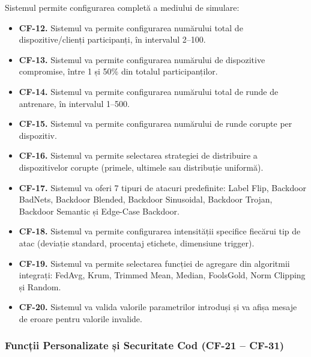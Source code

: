 \documentclass[../../main.tex]{subfiles}
\begin{document}
        Sistemul permite configurarea completă a mediului de simulare:
        \begin{itemize}
            \item \textbf{CF-12.} Sistemul va permite configurarea numărului total de dispozitive/clienți participanți, în intervalul 2--100.
            \item \textbf{CF-13.} Sistemul va permite configurarea numărului de dispozitive compromise, între 1 și 50\% din totalul participanților.
            \item \textbf{CF-14.} Sistemul va permite configurarea numărului total de runde de antrenare, în intervalul 1--500.
            \item \textbf{CF-15.} Sistemul va permite configurarea numărului de runde corupte per dispozitiv.
            \item \textbf{CF-16.} Sistemul va permite selectarea strategiei de distribuire a dispozitivelor corupte (primele, ultimele sau distribuție uniformă).
            \item \textbf{CF-17.} Sistemul va oferi 7 tipuri de atacuri predefinite: Label Flip, Backdoor BadNets, Backdoor Blended, Backdoor Sinusoidal, Backdoor Trojan, Backdoor Semantic și Edge-Case Backdoor.
            \item \textbf{CF-18.} Sistemul va permite configurarea intensității specifice fiecărui tip de atac (deviație standard, procentaj etichete, dimensiune trigger).
            \item \textbf{CF-19.} Sistemul va permite selectarea funcției de agregare din algoritmii integrați: FedAvg, Krum, Trimmed Mean, Median, FoolsGold, Norm Clipping și Random.
            \item \textbf{CF-20.} Sistemul va valida valorile parametrilor introduși și va afișa mesaje de eroare pentru valorile invalide.
        \end{itemize}

        \subsubsection{Funcții Personalizate și Securitate Cod (CF-21 -- CF-31)}
\end{document}
